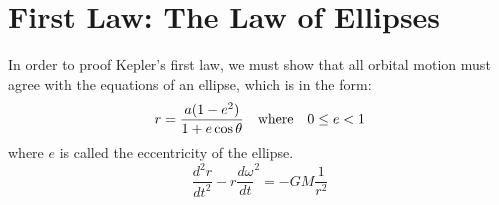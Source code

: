 \documentclass[11pt]{article}
\begin{document}
%
%  
%
%  
%  
%  
%
%  
%
%  
%
%  
%
% 
%
%
%
% 
%
%

\section{First Law: The Law of Ellipses}
In order to proof Kepler's first law, we must show that all orbital motion must
agree with the equations of an ellipse, which is in the form:
\begin{equation}
  r=\frac{a(1-e^2)}{1+e\cos\theta}
  \quad\textnormal{\normalsize where}\quad
  0\leq e < 1
\end{equation}
where $e$ is called the eccentricity of the ellipse.
\begin{equation}
  \frac{d^2r}{dt^2} - r\frac{d\omega}{dt}^2 = -GM\frac{1}{r^2}
  \label{differential}
\end{equation}
\end{document}
